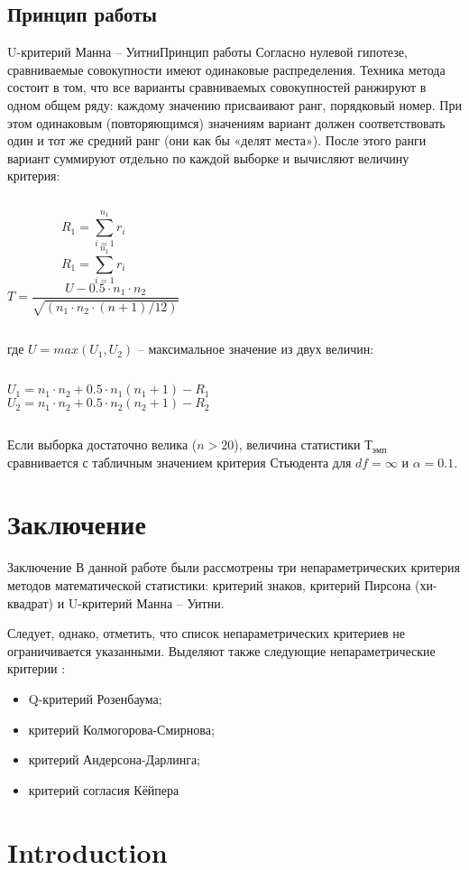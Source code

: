 \documentclass{beamer}
\begin{document}
\subsection{Принцип работы}
\begin{frame}{U-критерий Манна – Уитни}{Принцип работы}
    \footnotesize
    Согласно нулевой гипотезе, сравниваемые совокупности имеют одинаковые распределения. Техника метода состоит в том, что все варианты сравниваемых совокупностей ранжируют в одном общем ряду: каждому значению присваивают ранг, порядковый номер. При этом одинаковым (повторяющимся) значениям вариант должен соответствовать один и тот же средний ранг (они как бы «делят места»). После этого ранги вариант суммируют отдельно по каждой выборке и вычисляют величину критерия:
    \begin{columns}
        \pause
        $$
            R_1=\sum_{i=1}^{n_1} r_i
        $$
        \pause
        $$
            R_1=\sum_{i=1}^{n_1} r_i
        $$
        \pause
        $$
            T =\frac{U - 0.5 \cdot n_1 \cdot n_2}{\sqrt{(n_1 \cdot n_2 \cdot (n+1)/12)}}
        $$      
    \end{columns}

    \smallskip
    \pause
    где $U = max(U_1, U_2)$ – максимальное значение из двух величин:
    \begin{columns}
        $$
            U_1 = n_1 \cdot n_2 + 0.5 \cdot n_1(n_1+1)-R_1
        $$
        $$
            U_2 = n_1 \cdot n_2 + 0.5 \cdot n_2(n_2+1)-R_2
        $$      
    \end{columns}

    \pause
    \medskip                          
    Если выборка достаточно велика ($n > 20$), величина статистики $Т_{эмп}$ сравнивается с табличным значением критерия Стьюдента для $df = \infty$ и $\alpha = 0.1$.
\end{frame}

\section{Заключение}
\begin{frame}{Заключение}
    В данной работе были рассмотрены три непараметрических критерия методов математической статистики: критерий знаков, критерий Пирсона (хи-квадрат) и U-критерий Манна – Уитни.

    \pause
    \smallskip
    Следует, однако, отметить, что список непараметрических критериев не ограничивается указанными. Выделяют также следующие непараметрические критерии :

    \begin{itemize}[<+->]
        \item Q-критерий Розенбаума;
        \item критерий Колмогорова-Смирнова;
        \item критерий Андерсона-Дарлинга;
        \item критерий согласия Кёйпера
    \end{itemize}
\end{frame}

\section{Introduction}
\end{document}
